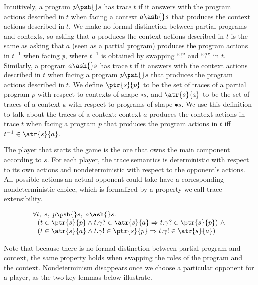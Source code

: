 \documentclass[10pt, conference, compsocconf, letterpaper, times]{IEEEtran}
\begin{document}
Intuitively, a program $p \psh{} s$ has trace $t$ if it answers with the
{program} actions described in $t$ when facing a context $a \ash{}s$ that
produces the {context} actions described in $t$.
\ifsooner
We make no formal distinction between partial programs and contexts,
so asking that $a$ produces the context actions described in
$t$ is the same as asking that $a$ (seen as a partial program)
produces the program actions in $t^{-1}$ when facing $p$, where
$t^{-1}$ is obtained by swapping ``!'' and ``?'' in $t$.
\fi
Similarly, a program $a \ash{}s$ has trace $t$ if it answers with the
{context} actions described in $t$ when facing a program $p \psh{}s$
that produces the {program} actions described in $t$.
We define $\ptr{s}{p}$ to be the set of traces of a partial program
$p$ with respect to contexts of shape ${\circ}s$, and $\atr{s}{a}$
to be the set of traces of a context $a$ with respect to programs of
shape ${\bullet}s$.
\ifsooner
We use this definition to talk about the traces of a context:
context $a$ produces the context actions in trace $t$ when facing a
program $p$ that produces the program actions in $t$ iff
$t^{-1} \in \atr{s}{a}$.
\fi

The player that starts the game is the one that owns the main
component according to $s$.
For each player, the trace semantics is deterministic with respect to
its own actions and nondeterministic with respect to the opponent's
actions.
All possible actions an actual opponent could take have a
corresponding nondeterministic choice, which is formalized by a
property we call trace extensibility.

\begin{lemma}
\label{lem:trace-ext}
\[
\begin{array}{l}
\forall t,\; s,\; p \psh{}s,\; a \ash{}s. \\
  ~~ ( t \in \ptr{s}{p} \wedge t.\gamma? \in \atr{s}{a} \Rightarrow
       t.\gamma? \in \ptr{s}{p} ) ~ \wedge \\
  ~~ ( t \in \atr{s}{a} \wedge t.\gamma! \in \ptr{s}{p} \Rightarrow
       t.\gamma! \in \atr{s}{a} )
\end{array}
\]
\end{lemma}

\ifsooner
\iffull
Note that because there is no formal distinction between partial
program and context, the same property holds when swapping the
roles of the program and the context.
\fi
\fi
Nondeterminism disappears once we choose a particular opponent for
a player, as the two key lemmas below illustrate.
\end{document}
